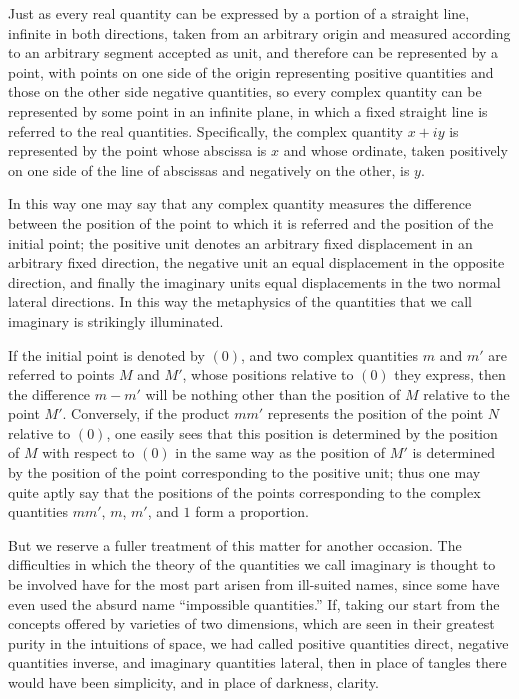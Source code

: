 \documentclass[12pt]{article}
\begin{document}
Just as every real quantity can be expressed by a portion of a straight line, infinite in both directions, taken from an arbitrary origin and measured according to an arbitrary segment accepted as unit, and therefore can be represented by a point, with points on one side of the origin representing positive quantities and those on the other side negative quantities, so every complex quantity can be represented by some point in an infinite plane, in which a fixed straight line is referred to the real quantities. Specifically, the complex quantity $x+iy$ is represented by the point whose abscissa is $x$ and whose ordinate, taken positively on one side of the line of abscissas and negatively on the other, is $y$.

In this way one may say that any complex quantity measures the difference between the position of the point to which it is referred and the position of the initial point; the positive unit denotes an arbitrary fixed displacement in an arbitrary fixed direction, the negative unit an equal displacement in the opposite direction, and finally the imaginary units equal displacements in the two normal lateral directions. In this way the metaphysics of the quantities that we call imaginary is strikingly illuminated.

If the initial point is denoted by $(0)$, and two complex quantities $m$ and $m'$ are referred to points $M$ and $M'$, whose positions relative to $(0)$ they express, then the difference $m-m'$ will be nothing other than the position of $M$ relative to the point $M'$. Conversely, if the product $mm'$ represents the position of the point $N$ relative to $(0)$, one easily sees that this position is determined by the position of $M$ with respect to $(0)$ in the same way as the position of $M'$ is determined by the position of the point corresponding to the positive unit; thus one may quite aptly say that the positions of the points corresponding to the complex quantities $mm'$, $m$, $m'$, and $1$ form a proportion.

But we reserve a fuller treatment of this matter for another occasion. The difficulties in which the theory of the quantities we call imaginary is thought to be involved have for the most part arisen from ill-suited names, since some have even used the absurd name ``impossible quantities.'' If, taking our start from the concepts offered by varieties of two dimensions, which are seen in their greatest purity in the intuitions of space, we had called positive quantities direct, negative quantities inverse, and imaginary quantities lateral, then in place of tangles there would have been simplicity, and in place of darkness, clarity.
\end{document}
